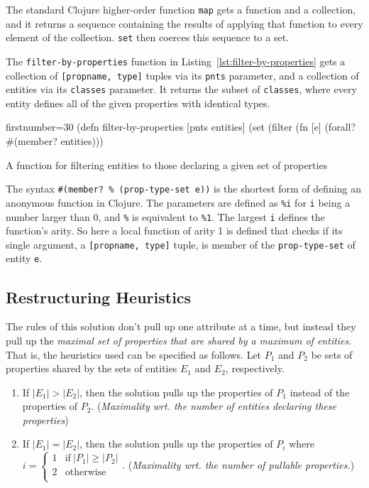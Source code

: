 \documentclass[11pt]{article}
\begin{document}
The standard Clojure higher-order function \verb|map| gets a function and a
collection, and it returns a sequence containing the results of applying that
function to every element of the collection.  \verb|set| then coerces this
sequence to a set.


The \verb|filter-by-properties| function in
Listing~\ref{lst:filter-by-properties} gets a collection of
\verb|[propname, type]| tuples via its \verb|pnts| parameter, and a collection
of entities via its \verb|classes| parameter.  It returns the subset of
\verb|classes|, where every entity defines all of the given properties with
identical types.

\begin{listing}[htbp]
  \begin{clojurecode*}{firstnumber=30}
(defn filter-by-properties [pnts entities]
  (set (filter (fn [e]
                 (forall? #(member? %
               entities)))
  \end{clojurecode*}
  \caption{A function for filtering entities to those declaring a given set of
    properties}
  \label{lst:filter-by-properties}
\end{listing}


The syntax \verb|#(member? % (prop-type-set e))| is the shortest form of
defining an anonymous function in Clojure.  The parameters are defined as
\verb|%i| for \verb|i| being
a number larger than 0, and \verb|%| is equivalent
to \verb|%1|.  The largest \verb|i| defines the function's arity.  So here a
local function of arity 1 is defined that checks if its single argument, a
\verb|[propname, type]| tuple, is member of the \verb|prop-type-set| of entity
\verb|e|.


\subsection{Restructuring Heuristics}
\label{sec:restructuring-heuristics}

The rules of this solution don't pull up one attribute at a time, but instead
they pull up the \emph{maximal set of properties that are shared by a maximum
  of entities}.  That is, the heuristics used can be specified as follows.  Let
$P_1$ and $P_2$ be sets of properties shared by the sets of entities $E_1$ and
$E_2$, respectively.

\begin{enumerate}
\item If $|E_1| > |E_2|$, then the solution pulls up the properties of $P_1$
  instead of the properties of $P_2$.  (\emph{Maximality wrt. the number of
    entities declaring these properties})
\item If $|E_1| = |E_2|$, then the solution pulls up the properties of $P_i$
  where~$i = \left\{\begin{array}{ll}1 & \text{if}~|P_1| \geq |P_2|\\2 &
      \text{otherwise}\\ \end{array}\right.$.  (\emph{Maximality wrt. the
    number of pullable properties.})
\end{enumerate}
\end{document}
